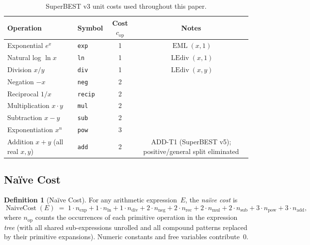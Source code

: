 \documentclass[12pt,a4paper]{article}
\theoremstyle{definition}
\newtheorem{definition}[theorem]{Definition}
\newcommand{\EML}{\operatorname{EML}}
\newcommand{\LEdiv}{\operatorname{LEdiv}}
\newcommand{\NC}{\operatorname{NaiveCost}}
\begin{document}
\begin{table}[h]
\centering
\caption{SuperBEST v3 unit costs used throughout this paper.}
\label{tab:sb3}
\smallskip
\begin{tabular}{@{}llcc@{}}
\toprule
\textbf{Operation} & \textbf{Symbol} &
  \textbf{Cost $c_{\mathrm{op}}$} & \textbf{Notes} \\
\midrule
Exponential $e^x$            & \texttt{exp}   & 1  & $\EML(x,1)$ \\
Natural log $\ln x$          & \texttt{ln}    & 1  & $\LEdiv(x,1)$ \\
Division $x/y$               & \texttt{div}   & 1  & $\LEdiv(x,y)$ \\
Negation $-x$                & \texttt{neg}   & 2  & \\
Reciprocal $1/x$             & \texttt{recip} & 2  & \\
Multiplication $x\cdot y$    & \texttt{mul}   & 2  & \\
Subtraction $x - y$          & \texttt{sub}   & 2  & \\
Exponentiation $x^n$         & \texttt{pow}   & 3  & \\
Addition $x+y$ (all real $x,y$) & \texttt{add} & 2  & ADD-T1 (SuperBEST v5); positive/general split eliminated \\
\bottomrule
\end{tabular}
\end{table}

\subsection{Na\"{i}ve Cost}

\begin{definition}[Na\"{i}ve Cost]
\label{def:NC}
For any arithmetic expression~$E$, the \emph{na\"{i}ve cost} is
\begin{equation}
  \NC(E) \;=\;
    1 \cdot n_{\exp}
  + 1 \cdot n_{\ln}
  + 1 \cdot n_{\mathrm{div}}
  + 2 \cdot n_{\mathrm{neg}}
  + 2 \cdot n_{\mathrm{rec}}
  + 2 \cdot n_{\mathrm{mul}}
  + 2 \cdot n_{\mathrm{sub}}
  + 3 \cdot n_{\mathrm{pow}}
  + 3 \cdot n_{\mathrm{add}},
\label{eq:NC}
\end{equation}
where $n_{\mathrm{op}}$ counts the occurrences of each primitive operation in
the expression \emph{tree} (with all shared sub-expressions unrolled and all
compound patterns replaced by their primitive expansions).
Numeric constants and free variables contribute~$0$.
\end{definition}
\end{document}
